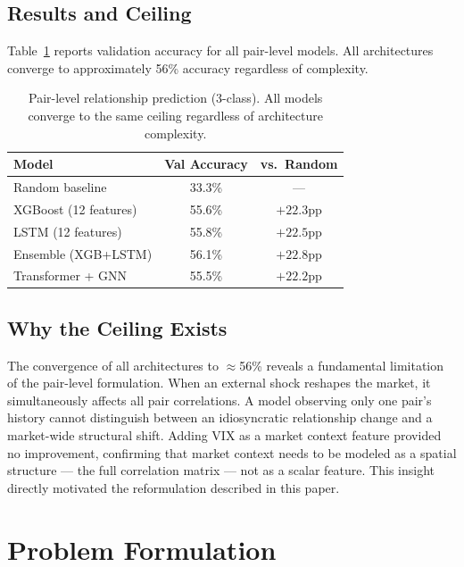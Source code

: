 \documentclass[runningheads]{llncs}
\begin{document}
\subsection{Results and Ceiling}

Table~\ref{tab:trial1} reports validation accuracy for all pair-level
models. All architectures converge to approximately 56\% accuracy
regardless of complexity.

\begin{table}[H]
\caption{Pair-level relationship prediction (3-class). All models
converge to the same ceiling regardless of architecture complexity.}
\label{tab:trial1}
\centering
\begin{tabular}{lcc}
\toprule
\textbf{Model} & \textbf{Val Accuracy} & \textbf{vs.\ Random} \\
\midrule
Random baseline       & 33.3\% & --- \\
XGBoost (12 features) & 55.6\% & $+22.3$pp \\
LSTM (12 features)    & 55.8\% & $+22.5$pp \\
Ensemble (XGB+LSTM)   & 56.1\% & $+22.8$pp \\
Transformer + GNN     & 55.5\% & $+22.2$pp \\
\bottomrule
\end{tabular}
\end{table}

\subsection{Why the Ceiling Exists}

The convergence of all architectures to $\approx$56\% reveals a
fundamental limitation of the pair-level formulation. When an external
shock reshapes the market, it simultaneously affects all pair
correlations. A model observing only one pair's history cannot distinguish
between an idiosyncratic relationship change and a market-wide structural
shift. Adding VIX as a market context feature provided no improvement,
confirming that market context needs to be modeled as a spatial structure
--- the full correlation matrix --- not as a scalar feature. This insight
directly motivated the reformulation described in this paper.

\section{Problem Formulation}\label{sec:formulation}
\end{document}
